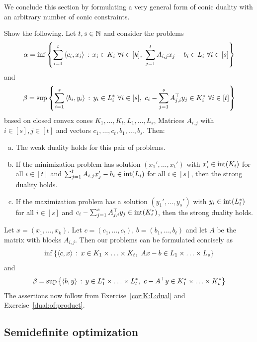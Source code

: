 We conclude this section by formulating a very general form of conic duality with an arbitrary number of conic constraints. 

\begin{exercise}
	\label{cor:K:L:dual}
	Show the following. Let $t, s \in \mathbb{N}$ and consider the problems
	\[
		\alpha  = \inf \left\{ \sum_{i=1}^t \left\langle c_i , x_i \right\rangle  \,:\, x_i \in K_i \ \forall i \in [k], \ \sum_{j=1}^t A_{i,j} x_j - b_i \in L_i \ \forall i \in [s] \right\}
	\]
	and
	\[
		\beta = \sup \setcond{ \sum_{i=1}^s \sprod{b_i}{y_i} }{y_i \in L_i^\ast \ \forall i \in [s], \ c_i - \sum_{j=1}^s A_{j,i}^\top y_j  \in K_i^\ast \ \forall i \in [t]}
	\]
	based on closed convex cones $K_1,\ldots,K_t, L_1,\ldots,L_s$, Matrices $A_{i,j}$ with $i \in [s], j \in [t]$ and vectors $c_1,\ldots,c_t,b_1,\ldots,b_s$. Then: 
	\begin{enumerate}[(a)]
		\item The weak duality holds for this pair of problems.
		\item If the minimization problem has solution $(x_1',\ldots,x_t')$ with $x_i' \in \operatorname{int}(K_i)$ for all $i \in [t]$ and $\sum_{j=1}^t A_{i,j} x_j' - b_i \in \operatorname{int}(L_i)$ for all $i \in [s]$, then the strong duality holds.
		\item If the maximization problem has a solution $(y_1',\ldots,y_s')$ with $y_i \in \operatorname{int}(L_i^\ast)$ for all $i \in [s]$ and $c_i - \sum_{j=1}^s A_{j,i}^\top y_j \in \operatorname{int}(K_i^\ast)$, then the strong duality holds.
	\end{enumerate}
\end{exercise}
\begin{solution}
	Let $x=(x_1,\ldots,x_k)$. Let $c=(c_1,\ldots,c_t)$, $b=(b_1,\ldots,b_t)$ and let $A$ be the matrix with blocks $A_{i,j}$. Then our problems can be formulated concisely as
	\[
		\inf \left\{ \left\langle c , x \right\rangle \,:\, x \in K_1 \times \ldots \times K_t,  \ A x - b \in L_1 \times \ldots \times L_s  \right\}
	\]
	and
	\[
		\beta = \sup \setcond{\sprod{b}{y}}{y \in L_1^\ast \times \ldots \times L_t^\ast, \ c- A^\top y \in K_1^\ast \times \ldots \times K_t^\ast}
	\]
	The assertions now follow from Exercise~\ref{cor:K:L:dual} and Exercise~\ref{dual:of:product}.
\end{solution}


\subsection{Semidefinite optimization}

